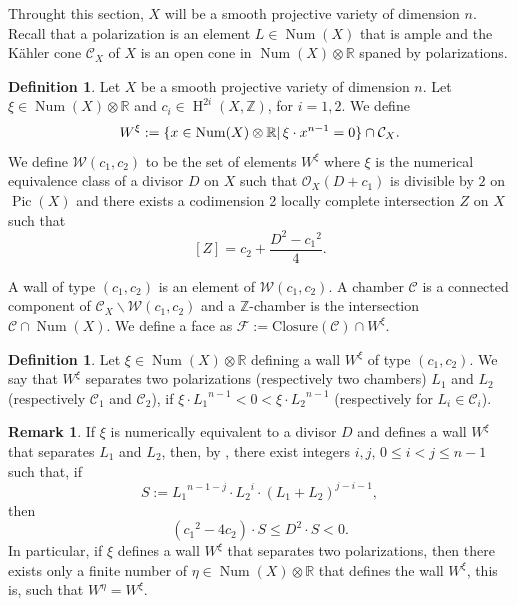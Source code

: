 \documentclass[11pt,twoside]{amsart}
\theoremstyle{definition}
\newtheorem{remark}[theorem]{Remark}
\newtheorem{definition}[theorem]{Definition}
\newcommand {\Closure}{\mathrm{Closure}}
\newcommand{\Pic}{\operatorname{Pic}}
\newcommand{\Num}{\operatorname{Num}}
\newcommand{\Ho}{\operatorname{H}}
\begin{document}
Throught this section, $X$ will be a smooth projective variety of dimension $n$. Recall that a polarization is an element $L\in \Num(X)$ that is ample and the Kähler cone $\mathcal{C}_X$ of $X$ is an open cone in $\Num(X)\otimes \mathbb{R}$ spaned by polarizations.
\begin{definition}
    Let $X$ be a smooth projective variety of dimension $n$. Let $\xi\in\Num(X)\otimes\mathbb{R}$ and $c_i\in\Ho^{2i}(X,\mathbb{Z})$, for $i=1,2$. 
    We define $$W^\xi:=\{x\in\Num(X)\otimes \mathbb{R}|\thinspace \xi\cdot x^{n-1}=0\}\cap \mathcal{C}_X.$$
We define $\mathcal{W}(c_1,c_2)$ to be the set of elements $W^\xi$ where $\xi$ is the numerical equivalence class of a divisor $D$ on $X$ such that
 $\mathcal{O}_X(D+c_1)$ is divisible by $2$ on $\Pic(X)$ and
  there exists a codimension 2 locally complete intersection 
      $Z$ on $X$ such that $$[Z]=c_2+\frac{D^2-{c_1}^2}{4}.$$



A wall of type $(c_1,c_2)$ is an element of $\mathcal{W}(c_1,c_2)$.
A chamber $\mathcal{C}$ is a connected component of $\mathcal{C}_X\backslash\mathcal{W}(c_1,c_2)$ and a $\mathbb{Z}$-chamber is the intersection $\mathcal{C}\cap \Num(X)$. We define a face as $\mathcal{F}:=\Closure(\mathcal{C})\cap W^{\xi}$. %


\end{definition}

\begin{definition}
    Let $\xi\in\Num(X)\otimes\mathbb{R}$ defining a wall $W^{\xi}$ of type $(c_1,c_2)$. We say that $W^{\xi}$ separates two polarizations (respectively two chambers) $L_1$ and $L_2$ (respectively $\mathcal{C}_1$ and $\mathcal{C}_2$),  if $\xi\cdot{L_1}^{n-1}<0< \xi\cdot{L_2}^{n-1}$ (respectively for $L_i\in\mathcal{C}_i$). 
\end{definition}

\begin{remark}\label{remark_finitos_xi}
    If $\xi$ is numerically equivalent to a divisor $D$ and defines a wall $W^{\xi}$ that separates $L_1$ and $L_2$, then, by \cite[Theorem 1.2.5]{Qin1}, there exist integers $i,j$, $0\leq i<j\leq n-1$ such that, if $$S:={L_1}^{n-1-j}\cdot {L_2}^{i}\cdot (L_1+L_2)^{j-i-1},$$
    then $$({c_1}^2-4c_2)\cdot S\leq D^2\cdot S<0.$$
    In particular, if $\xi$ defines a wall $W^{\xi}$ that separates two polarizations, then there exists only a 
 finite number of $\eta\in\Num(X)\otimes \mathbb{R}$  that  defines the wall $W^{\xi}$, this is, such that $W^{\eta}=W^{\xi}$.
\end{remark}
\end{document}
